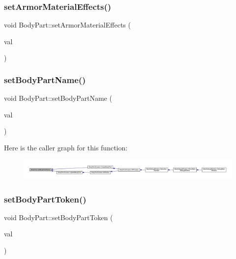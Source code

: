\subsubsection{\texorpdfstring{set\+Armor\+Material\+Effects()}{setArmorMaterialEffects()}}
{\footnotesize\ttfamily void Body\+Part\+::set\+Armor\+Material\+Effects (\begin{DoxyParamCaption}\item[{\mbox{\hyperlink{struct_applied_force_effect}{Applied\+Force\+Effect}}}]{val }\end{DoxyParamCaption})}

\mbox{\label{class_body_part_a9d3d014b8d645dbbf1ef6c14335ef940}} 
\subsubsection{\texorpdfstring{set\+Body\+Part\+Name()}{setBodyPartName()}}
{\footnotesize\ttfamily void Body\+Part\+::set\+Body\+Part\+Name (\begin{DoxyParamCaption}\item[{std\+::string}]{val }\end{DoxyParamCaption})}

Here is the caller graph for this function\+:
\nopagebreak
\begin{figure}[H]
\begin{center}
\leavevmode
\includegraphics[width=350pt]{d2/d6f/class_body_part_a9d3d014b8d645dbbf1ef6c14335ef940_icgraph}
\end{center}
\end{figure}
\mbox{\label{class_body_part_afe0684374c38122fe9316bedff8742dc}} 
\subsubsection{\texorpdfstring{set\+Body\+Part\+Token()}{setBodyPartToken()}}
{\footnotesize\ttfamily void Body\+Part\+::set\+Body\+Part\+Token (\begin{DoxyParamCaption}\item[{std\+::string}]{val }\end{DoxyParamCaption})}

